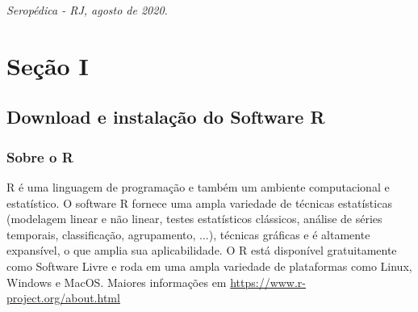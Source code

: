 \documentclass[11pt,fleqn]{book} %
\begin{document}
\noindent \textit{Seropédica - RJ, agosto de 2020.} \\ %





\pagestyle{empty} %

\renewcommand*\contentsname{Sumário} %

\tableofcontents %

\cleardoublepage %

\pagestyle{fancy} %



\part{Seção I}



\chapter{Download e instalação do Software R}


\section{Sobre o R}

R é uma linguagem de programação e também um ambiente computacional e estatístico. O software R fornece uma ampla variedade de técnicas estatísticas (modelagem linear e não linear, testes estatísticos clássicos, análise de séries temporais, classificação, agrupamento, ...), técnicas gráficas e é altamente expansível, o que amplia sua aplicabilidade. O R está disponível gratuitamente como Software Livre e roda em uma ampla variedade de plataformas como Linux, Windows e MacOS. Maiores informações em \url{https://www.r-project.org/about.html}
\end{document}
